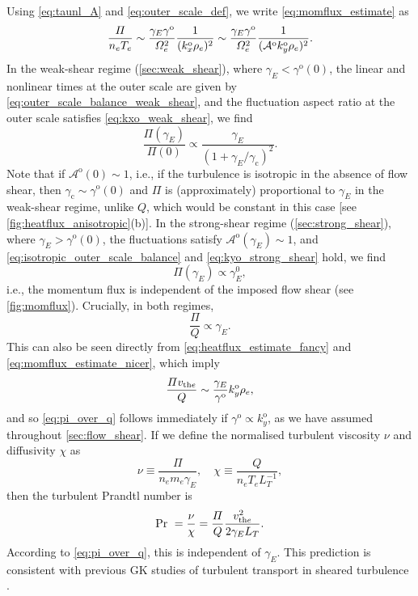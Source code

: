 \documentclass{jpp}
\newcommand{\kxo}{k_x^\text{o}}
\newcommand{\kyo}{k_y^\text{o}}
\newcommand{\gammao}{\gamma^\text{o}}
\newcommand{\gammaoO}{\gamma^\text{o}(0)}
\newcommand{\gammaani}{\gamma_{\text{c}}}
\newcommand{\gammaE}{\gamma_{E}}
\newcommand{\A}{\mathcal{A}}
\newcommand{\Ao}{\A^\text{o}}
\newcommand{\AoO}{\A^\text{o}(0)}
\begin{document}
Using \cref{eq:taunl_A} and \cref{eq:outer_scale_def}, we write \cref{eq:momflux_estimate} as
\begin{equation}
	\frac{\Pi}{n_{e} T_{e}} \sim \frac{\gammaE \gammao}{\Omega_e^2} \frac{1}{(\kxo \rhoe)^2}\sim \frac{\gammaE \gammao}{\Omega_e^2} \frac{1}{(\Ao \kyo \rhoe)^2}.
	\label{eq:momflux_estimate_nicer}
\end{equation}
In the weak-shear regime (\cref{sec:weak_shear}), where \mbox{\(\gammaE < \gammaoO\)}, the linear and nonlinear times at the outer scale are given by \cref{eq:outer_scale_balance_weak_shear}, and the fluctuation aspect ratio at the outer scale satisfies \cref{eq:kxo_weak_shear}, we find 
\begin{equation}
	\frac{\Pi(\gammaE)}{\Pi(0)} \propto \frac{\gammaE}{(1 + \gammaE/\gammaani)^2}.
	\label{eq:momflux_weakshear}
\end{equation}
Note that if \(\AoO\sim1\), i.e., if the turbulence is isotropic in the absence of flow shear, then \(\gammaani\sim\gammaoO\) and \(\Pi\) is (approximately) proportional to \(\gammaE\) in the weak-shear regime, unlike \(Q\), which would be constant in this case [see \cref{fig:heatflux_anisotropic}(b)]. In the strong-shear regime (\cref{sec:strong_shear}), where \mbox{\(\gammaE > \gammaoO\)}, the fluctuations satisfy \(\Ao(\gammaE) \sim 1\), and \cref{eq:isotropic_outer_scale_balance} and \cref{eq:kyo_strong_shear} hold, we find
\begin{equation}
	\Pi(\gammaE) \propto \gammaE^0,
	\label{eq:momflux_strongshear}
\end{equation}
i.e., the momentum flux is independent of the imposed flow shear (see \cref{fig:momflux}). Crucially, in both regimes,
\begin{equation}
	\frac{\Pi}{Q} \propto \gammaE.
	\label{eq:pi_over_q}
\end{equation}
This can also be seen directly from \cref{eq:heatflux_estimate_fancy} and \cref{eq:momflux_estimate_nicer}, which imply
\begin{equation}
	\frac{\Pi \vthe}{Q} \sim \frac{\gammaE}{\gammao} \kyo \rhoe,
\end{equation}
and so \cref{eq:pi_over_q} follows immediately if \(\gammao \propto \kyo\), as we have assumed throughout \cref{sec:flow_shear}. If we define the normalised turbulent viscosity \(\nu\) and diffusivity \(\chi\) as
\begin{equation}
	\nu \equiv \frac{\Pi}{n_{e} m_e \gammaE}, \quad
	\chi \equiv \frac{Q}{n_{e} T_{e}L_T^{-1}},
\end{equation}
then the turbulent Prandtl number is
\begin{equation}
	\text{Pr} \ = \frac{\nu}{\chi} = \frac{\Pi}{Q} \frac{\vthe^2}{2\gammaE L_T}.
	\label{eq:pr_nice}
	\end{equation}
According to \cref{eq:pi_over_q}, this is independent of \(\gammaE\). This prediction is consistent with previous GK studies of turbulent transport in sheared turbulence \citep{highcock10, barnes_shear11}.
\end{document}
